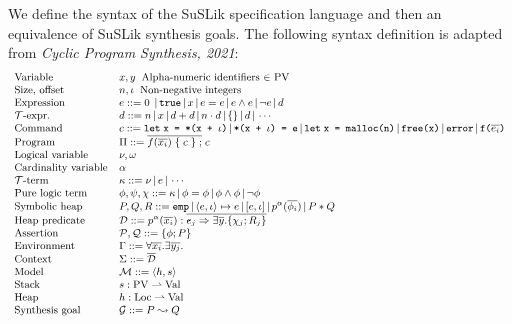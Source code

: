 \documentclass[10pt]{article}
\begin{document}
We define the syntax of the SuSLik specification language and then an equivalence of SuSLik synthesis goals.
The following syntax definition is adapted from \textit{Cyclic Program Synthesis, 2021}:
\\
\[ \small
  \begin{array}[t]{ l l }
    \text{Variable} &x, y\;\; \text{Alpha-numeric identifiers $\in$ PV}\\
    \text{Size, offset} &n, \iota\;\; \text{Non-negative integers}\\
    \text{Expression} &e ::= 0\; \alt \true \alt x \alt e = e \alt e \land e \alt \neg e \alt d\\
    \text{$\mathcal{T}$-expr.} &d ::= n \alt x \alt d + d \alt n \cdot d \alt \{\} \alt {d} \alt \cdots\\
    \text{Command} &c ::= \letbnd\; \ttt{x = *(x + }\iota\ttt{)} \alt \ttt{*(x + }\iota\ttt{) = e} \alt
      \letbnd\; \ttt{x = malloc(n)} \alt \ttt{free(x)} \alt \ttt{error}\newline
      \alt \ttt{f(}\overline{e_i}\ttt{)}\\
    \text{Program} &\Pi ::= \overline{f(\overline{x_i})\; \{\; c\; \}\; ;}\; c\\

    \text{Logical variable} &\nu, \omega\\
    \text{Cardinality variable} &\alpha\\
    \text{$\mathcal{T}$-term} &\kappa ::= \nu \alt e \alt \cdots\\
    \text{Pure logic term} &\phi, \psi, \chi ::= \kappa \alt \phi = \phi \alt \phi \land \phi \alt \neg \phi\\
    \text{Symbolic heap} &P, Q, R ::= \ttt{emp} \alt \mbox{$\langle e, \iota \rangle \mapsto e \alt [e, \iota]$} \alt p^{\alpha}(\overline{\phi_i})
      \alt \mbox{$P * Q$}\\
    \text{Heap predicate} &\mathcal{D} ::= p^{\alpha}(\overline{x_i}) : \overline{e_j \Ra \exists \overline{y}.\{\chi_j;R_j\}}\\
    \text{Assertion} &\mathcal{P},\mathcal{Q} ::= \{\phi; P\}\\
    \text{Environment} &\Gamma ::= \forall\overline{x_i}.\exists\overline{y_j}.\\
    \text{Context} &\Sigma ::= \overline{\mathcal{D}}\\
    \text{Model} &\mathcal{M} ::= \langle h, s \rangle\\
    \text{Stack} &s : \text{PV} \rightharpoonup \text{Val}\\
    \text{Heap} &h : \text{Loc} \rightharpoonup \text{Val}\\
    \text{Synthesis goal} &\mathcal{G} ::= P \leadsto Q
  \end{array}
\]
\end{document}
